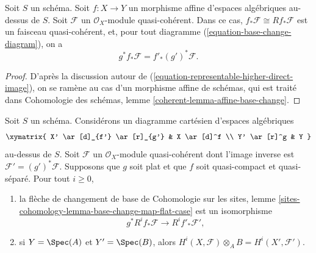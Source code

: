 \begin{lemma}
\label{lemma-affine-base-change}
Soit $S$ un schéma. Soit $f : X \to Y$ un morphisme affine d'espaces
algébriques au-dessus de $S$. Soit $\mathcal{F}$ un $\mathcal{O}_X$-module quasi-cohérent.
Dans ce cas, $f_*\mathcal{F} \cong Rf_*\mathcal{F}$ est un faisceau quasi-cohérent,
et, pour tout diagramme (\ref{equation-base-change-diagram}),
on a
$$
g^*f_*\mathcal{F} = f'_*(g')^*\mathcal{F}.
$$
\end{lemma}

\begin{proof}
D'après la discussion autour de
(\ref{equation-representable-higher-direct-image}),
on se ramène au cas d'un morphisme affine de schémas, qui
est traité dans Cohomologie des schémas, lemme
\ref{coherent-lemma-affine-base-change}.
\end{proof}

\begin{lemma}
\label{lemma-flat-base-change-cohomology}
Soit $S$ un schéma. Considérons un diagramme cartésien d'espaces algébriques
$$
\xymatrix{
X' \ar[d]_{f'} \ar[r]_{g'} & X \ar[d]^f \\
Y' \ar[r]^g & Y
}
$$
au-dessus de $S$.
Soit $\mathcal{F}$ un $\mathcal{O}_X$-module quasi-cohérent
dont l'image inverse est $\mathcal{F}' = (g')^*\mathcal{F}$.
Supposons que $g$ soit plat et que $f$ soit quasi-compact et quasi-séparé.
Pour tout $i \geq 0$,
\begin{enumerate}
\item la flèche de changement de base de
Cohomologie sur les sites, lemme
\ref{sites-cohomology-lemma-base-change-map-flat-case}
est un isomorphisme
$$
g^*R^if_*\mathcal{F} \longrightarrow R^if'_*\mathcal{F}',
$$
\item si $Y = \Spec(A)$ et $Y' = \Spec(B)$, alors
$H^i(X, \mathcal{F}) \otimes_A B = H^i(X', \mathcal{F}')$.
\end{enumerate}
\end{lemma}

